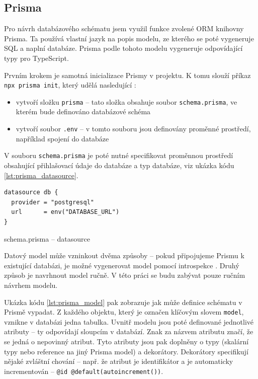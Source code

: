 \documentclass[thesis=M,czech]{FITthesis}[2019/12/23]
\begin{document}
\subsection{Prisma}
Pro návrh databázového schématu jsem využil funkce zvolené ORM knihovny Prisma. Ta používá vlastní jazyk na popis modelu, ze kterého se poté vygeneruje SQL a naplní databáze. Prisma podle tohoto modelu vygeneruje odpovídající typy pro TypeScript.

Prvním krokem je samotná inicializace Prismy v projektu. K tomu slouží příkaz \texttt{npx prisma init}, který udělá nasledující :
\begin{itemize}
  \item vytvoří složku \texttt{prisma} -- tato složka obsahuje soubor \texttt{schema.prisma}, ve kterém bude definováno databázové schéma
  \item vytvoří soubor \texttt{.env} -- v tomto souboru jsou definovány proměnné prostředí, například spojení do databáze
\end{itemize}

V souboru \texttt{schema.prisma} je poté nutné specifikovat proměnnou prostředí obsahující přihlašovací údaje do databáze a typ databáze, viz ukázka kódu \ref{lst:prisma_datasource}.

\begin{listing}[H]
\begin{verbatim}
datasource db {
  provider = "postgresql"
  url      = env("DATABASE_URL")
}
\end{verbatim}
\caption{schema.prisma -- datasource}
\label{lst:prisma_datasource}
\end{listing}

Datový model může vzninkout dvěma způsoby -- pokud připojujeme Prismu k existující databázi, je možné vygenerovat model pomocí introspekce \cite{prisma_introspection}. Druhý způsob je navrhnout model ručně. V této práci se budu zabývat pouze ručním návrhem modelu.

Ukázka kódu \ref{lst:prisma_model} pak zobrazuje jak může definice schématu v Prismě vypadat. Z každého objektu, který je označen klíčovým slovem \texttt{model}, vznikne v databázi jedna tabulka. Uvnitř modelu jsou poté definované jednotlivé atributy -- ty odpovídají sloupcím v databází. Znak za názvem atributu značí, že se jedná o nepovinný atribut. Tyto atributy jsou pak doplněny o typy (skalární typy nebo reference na jiný Prisma model) a dekorátory. Dekorátory specifikují nějaké zvláštní chování -- např. že atribut je identifikátor a je automaticky incrementován -- \texttt{@id @default(autoincrement())}.
\end{document}
